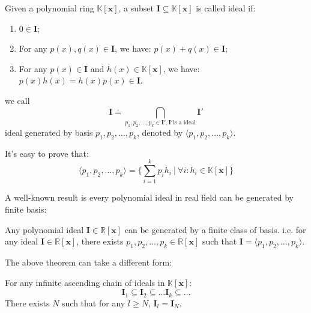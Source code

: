 \documentclass{jssc}
\begin{document}
\begin{definition}
Given a polynomial ring $\mathbb{K}[\boldsymbol{x}]$, a subset $\boldsymbol{I} \subseteq \mathbb{K}[\boldsymbol{x}]$ is called ideal if:
	\begin{enumerate}
		\item $0 \in \boldsymbol{I}$;
		\item For any $p(x), q(x) \in \boldsymbol{I}$, we have: $p(x)+q(x) \in \boldsymbol{I}$;
		\item For any $p(x) \in \boldsymbol{I}$ and $h(x) \in \mathbb{K}[\boldsymbol{x}]$, we have: $p(x)h(x) = h(x)p(x) \in \boldsymbol{I}$.
	\end{enumerate}
\end{definition}

\begin{definition}
we call
	\begin{displaymath}
		\boldsymbol{I} \doteq \bigcap_{p_1,p_2,\dots,p_k \in \boldsymbol{I}', \boldsymbol{I}'\text{is a ideal} }\boldsymbol{I}'
	\end{displaymath}
ideal generated by basis $p_1,p_2,\dots, p_k$, denoted by $\langle p_1, p_2, \dots, p_k \rangle$.

It's easy to prove that:
	\begin{displaymath}
		\langle p_1, p_2, \dots, p_k \rangle = \{\sum_{i=1}^k p_ih_i\ |\ \forall i : h_i \in \mathbb{K}[\boldsymbol{x}]\}
	\end{displaymath}
\end{definition}

A well-known result is every polynomial ideal in real field can be generated by finite basis:

\begin{theorem}
Any polynomial ideal $\boldsymbol{I} \in \mathbb{R}[\boldsymbol{x}]$ can be generated by a finite class of basis. i.e. for any ideal $\boldsymbol{I} \in \mathbb{R}[\boldsymbol{x}]$, there exists $p_1, p_2, \dots, p_k \in \mathbb{R}[\boldsymbol{x}]$ such that $\boldsymbol{I} = \langle p_1, p_2, \dots, p_k \rangle$.
\end{theorem}

The above theorem can take a different form:
\begin{theorem}
\label{thm:ascendingChain}
For any infinite ascending chain of ideals in $\mathbb{K}[\boldsymbol{x}]$:
	\begin{equation*}
		\boldsymbol{I}_1 \subseteq \boldsymbol{I}_2 \subseteq \dots \boldsymbol{I}_k \subseteq \dots
	\end{equation*}
There exists $N$ such that for any $l \geq N$, $\boldsymbol{I}_l = \boldsymbol{I}_N$.
\end{theorem}
\end{document}
